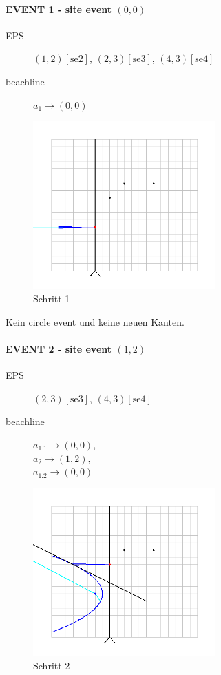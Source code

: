 \newpage

\paragraph*{EVENT 1 - site event $(0,0)$}
\begin{description}
\item[EPS] $(1,2)[\text{se2}]$, $(2,3)[\text{se3}]$, $(4,3)[\text{se4}]$
\item[beachline] $a_1 \rightarrow (0,0)$
\end{description}

\begin{figure}[h]
\begin{center}
\includegraphics[width=7cm]{capture1}
\end{center}
\caption{Schritt 1}
\label{fig:c1}
\end{figure}

Kein circle event und keine neuen Kanten.

\newpage

\paragraph*{EVENT 2 - site event $(1,2)$}
\begin{description}
\item[EPS] $(2,3)[\text{se3}]$, $(4,3)[\text{se4}]$
\item[beachline]
$a_{1.1} \rightarrow (0,0)$,\\
$a_2 \rightarrow (1,2)$,\\
$a_{1.2} \rightarrow (0,0)$\\
\end{description}

\begin{figure}[h]
\begin{center}
\includegraphics[width=7cm]{capture2}
\end{center}
\caption{Schritt 2}
\label{fig:c2}
\end{figure}

